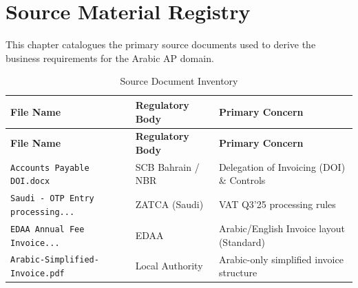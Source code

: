 \chapter{Source Material Registry}
\label{ch:source-registry}

This chapter catalogues the primary source documents used to derive the business requirements for the Arabic AP domain.

\begin{longtable}{p{5cm} p{3cm} p{6cm}}
\caption{Source Document Inventory} \\
\toprule
\textbf{File Name} & \textbf{Regulatory Body} & \textbf{Primary Concern} \\
\midrule
\endfirsthead
\toprule
\textbf{File Name} & \textbf{Regulatory Body} & \textbf{Primary Concern} \\
\midrule
\endhead
\texttt{Accounts Payable DOI.docx} & SCB Bahrain / NBR & Delegation of Invoicing (DOI) \& Controls \\
\texttt{Saudi - OTP Entry processing...} & ZATCA (Saudi) & VAT Q3'25 processing rules \\
\texttt{EDAA Annual Fee Invoice...} & EDAA & Arabic/English Invoice layout (Standard) \\
\texttt{Arabic-Simplified-Invoice.pdf} & Local Authority & Arabic-only simplified invoice structure \\
\bottomrule
\end{longtable}

